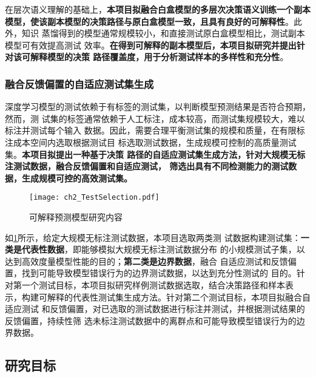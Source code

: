 在层次语义理解的基础上，\textbf{本项目拟融合白盒模型的多层次决策语义训练一个副本
模型，使该副本模型的决策路径与原白盒模型一致，且具有良好的可解释性}。此外，知识
蒸馏得到的模型通常规模较小，和直接测试原白盒模型相比，测试副本模型可有效提高测试
效率。\textbf{在得到可解释的副本模型后，本项目拟研究并提出针对该可解释模型的决策
路径覆盖度，用于分析测试样本的多样性和充分性}。

\subsubsection{融合反馈偏置的自适应测试集生成}
深度学习模型的测试依赖于有标签的测试集，以判断模型预测结果是否符合预期，然而，测
试集的标签通常依赖于人工标注，成本较高，而测试集规模较大，难以标注并测试每个输入
数据。因此，{需要合理平衡测试集的规模和质量，在有限标注成本空间内选取根据测试目
标选取测试数据，生成规模可控制的高质量测试集}。\textbf{本项目拟提出一种基于决策
路径的自适应测试集生成方法，针对大规模无标注测试数据，融合反馈偏置和自适应测试，
筛选出具有不同检测能力的测试数据，生成规模可控的高效测试集。}

\begin{figure}[htp]
    \begin{small}
        \begin{center}
            \texttt{[image: ch2\_TestSelection.pdf]}
        \end{center}
        \caption{可解释预测模型研究内容}
        \label{fig:ch2:testselection}
    \end{small}
\end{figure}

如\cref{fig:ch2:testselection}所示，给定大规模无标注测试数据，{本项目选取两类测
试数据构建测试集：\textbf{一类是代表性数据}，即能够模拟大规模无标注测试数据分布
的小规模测试子集，以达到高效度量模型性能的目的；\textbf{第二类是边界数据}，融合
自适应测试和反馈偏置，找到可能导致模型错误行为的边界测试数据，以达到充分性测试的
目的}。针对第一个测试目标，本项目拟研究样例测试数据选取，结合决策路径和样本表
示，构建可解释的代表性测试集生成方法。针对第二个测试目标，本项目拟融合自适应测试
和反馈偏置，对已选取的测试数据进行标注并测试，并根据测试结果的反馈偏置，持续性筛
选未标注测试数据中的离群点和可能导致模型错误行为的边界数据。




\subsection{研究目标}\label{ch2target}

